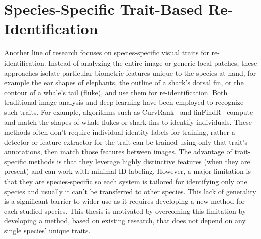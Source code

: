 \section{Species-Specific Trait-Based Re-Identification}
Another line of research focuses on species-specific visual traits for re-identification. Instead of analyzing the entire image or generic local patches, these approaches isolate particular biometric features unique to the species at hand, for example the ear shapes of elephants, the outline of a shark's dorsal fin, or the contour of a whale's tail (fluke), and use them for re-identification. Both traditional image analysis and deep learning have been employed to recognize such traits. For example, algorithms such as CurvRank~\cite{ani12151980} and finFindR~\cite{finFindR} compute and match the shapes of whale flukes or shark fins to identify individuals. These methods often don't require individual identity labels for training, rather a detector or feature extractor for the trait can be trained using only that trait's annotations, then match those features between images. The advantage of trait-specific methods is that they leverage highly distinctive features (when they are present) and can work with minimal ID labeling. However, a major limitation is that they are species-specific so each system is tailored for identifying only one species and usually it can't be transferred to other species. This lack of generality is a significant barrier to wider use as it requires developing a new method for each studied species. This thesis is motivated by overcoming this limitation by developing a method, based on existing research, that does not depend on any single species' unique traits. 


